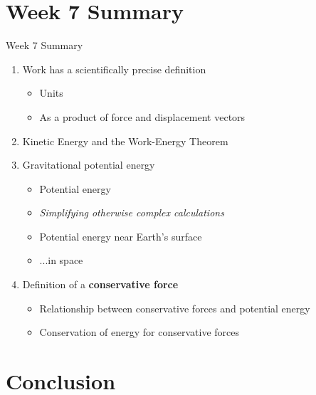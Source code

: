 \documentclass{beamer}
\begin{document}
\section{Week 7 Summary}

\begin{frame}{Week 7 Summary}
\begin{enumerate}
\item \alert{Work} has a scientifically precise definition
\begin{itemize}
\item Units
\item As a product of force and displacement vectors
\end{itemize}
\item Kinetic Energy and the \alert{Work-Energy Theorem}
\item Gravitational potential energy
\begin{itemize}
\item Potential energy
\item \textit{Simplifying otherwise complex calculations}
\item Potential energy near Earth's surface
\item ...in space
\end{itemize}
\item Definition of a \textbf{conservative force}
\begin{itemize}
\item Relationship between conservative forces and potential energy
\item Conservation of energy for conservative forces
\end{itemize}
\end{enumerate}
\end{frame}

\section{Conclusion}
\end{document}
